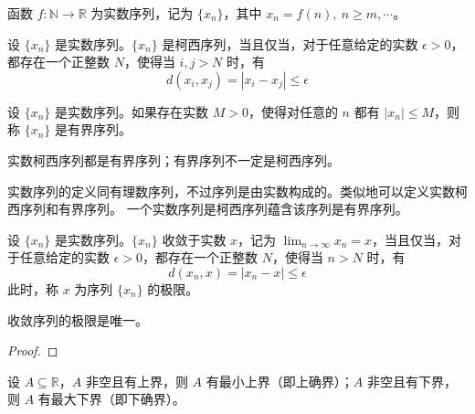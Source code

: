 \begin{definition}
    函数 $f:\mathbb{N}\to\mathbb{R}$ 为实数序列，记为 $\{x_n\}$，其中 $x_n=f(n),\ n\ge m,\cdots$。
\end{definition}

\begin{definition}
    设 $\{x_n\}$ 是实数序列。$\{x_n\}$ 是柯西序列，当且仅当，对于任意给定的实数 $\epsilon>0$，都存在一个正整数 $N$，使得当 $i,j>N$ 时，有
    \[
        d(x_i,x_j) = |x_i - x_j| \le \epsilon
    \]
\end{definition}

\begin{definition}
    设 $\{x_n\}$ 是实数序列。如果存在实数 $M>0$，使得对任意的 $n$ 都有 $|x_n|\le M$，则称 $\{x_n\}$ 是有界序列。
\end{definition}

\begin{theorem}
    实数柯西序列都是有界序列；有界序列不一定是柯西序列。
\end{theorem}

\begin{note}
    实数序列的定义同有理数序列，不过序列是由实数构成的。类似地可以定义实数柯西序列和有界序列。
    一个实数序列是柯西序列蕴含该序列是有界序列。
\end{note}
\vspace{1em}

\begin{definition}
    设 $\{x_n\}$ 是实数序列。$\{x_n\}$ 收敛于实数 $x$，记为 $\lim_{n\to\infty} x_n = x$，当且仅当，对于任意给定的实数 $\epsilon>0$，都存在一个正整数 $N$，使得当 $n>N$ 时，有
    \[
        d(x_n,x) = |x_n - x| \le \epsilon
    \]
    此时，称 $x$ 为序列 $\{x_n\}$ 的极限。
\end{definition}

\begin{lemma}
    收敛序列的极限是唯一。
\end{lemma}
\begin{proof}
    
\end{proof}

\begin{theorem}
    设 $A\subseteq\mathbb{R}$，$A$ 非空且有上界，则 $A$ 有最小上界（即上确界）；$A$ 非空且有下界，则 $A$ 有最大下界（即下确界）。
\end{theorem}

